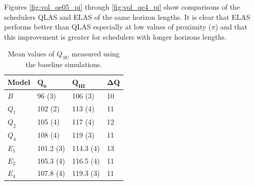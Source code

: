 Figures \ref{fig:vol_qe05_pi} through \ref{fig:vol_qe4_pi} show comparisons of the schedulers QLAS and ELAS of the same horizon lengths. It is clear that ELAS performs better than QLAS especially at low values of proximity ($\pi$) and that this improvement is greater for schedulers with longer horizons lengths.


\begin{table}[htbp]
\begin{center}
\begin{tabular}{|l|l|l|l|}
\hline
\bf{Model} &  $\mathbf{Q_0}$  & $\mathbf{Q_{HI}}$  & $\mathbf{\Delta Q}$ \\
\hline
$B$        & 96 (3)       &  106 (3)      &   10 \\
\hline
$Q_1$      & 102 (2)      &  113 (4)     &   11\\
\hline
$Q_2$      & 105 (4)      &  117 (4)     &  12\\
\hline
$Q_4$      & 108 (4)      &  119 (3)     &  11\\
\hline\hline
$E_1$      & 101.2 (3)    &  114.3 (4)     & 13 \\
\hline
$E_2$      & 105.3 (4)    &  116.5 (4)     &  11\\
\hline
$E_4$      & 107.8 (4)    &  119.3 (3)     &  11\\
\hline
\end{tabular}
\end{center}
\caption[Mean values of $Q_{SU}$ measured using baseline simulations.]
{Mean values of $Q_{SU}$ measured using the baseline simulations.} %
\label{tab:vollohi}
\end{table}





